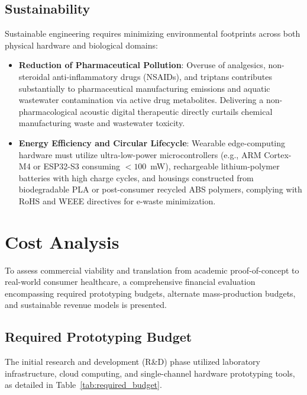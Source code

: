\documentclass[12pt, a4paper]{report}
\begin{document}
    \subsection{Sustainability}
    Sustainable engineering requires minimizing environmental footprints across both physical hardware and biological domains:
    \begin{itemize}
        \item \textbf{Reduction of Pharmaceutical Pollution}: Overuse of analgesics, non-steroidal anti-inflammatory drugs (NSAIDs), and triptans contributes substantially to pharmaceutical manufacturing emissions and aquatic wastewater contamination via active drug metabolites. Delivering a non-pharmacological acoustic digital therapeutic directly curtails chemical manufacturing waste and wastewater toxicity.
        \item \textbf{Energy Efficiency and Circular Lifecycle}: Wearable edge-computing hardware must utilize ultra-low-power microcontrollers (e.g., ARM Cortex-M4 or ESP32-S3 consuming $<100$~mW), rechargeable lithium-polymer batteries with high charge cycles, and housings constructed from biodegradable PLA or post-consumer recycled ABS polymers, complying with RoHS and WEEE directives for e-waste minimization.
    \end{itemize}

\section{Cost Analysis}
\label{sec:cost_analysis}
To assess commercial viability and translation from academic proof-of-concept to real-world consumer healthcare, a comprehensive financial evaluation encompassing required prototyping budgets, alternate mass-production budgets, and sustainable revenue models is presented.

\subsection{Required Prototyping Budget}
The initial research and development (R\&D) phase utilized laboratory infrastructure, cloud computing, and single-channel hardware prototyping tools, as detailed in Table~\ref{tab:required_budget}.
\end{document}
